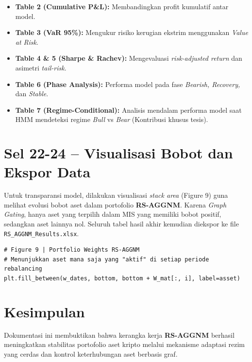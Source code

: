 \documentclass[12pt,a4paper]{article}
\begin{document}
\begin{itemize}
    \item \textbf{Table 2 (Cumulative P\&L):} Membandingkan profit kumulatif antar model.
    \item \textbf{Table 3 (VaR 95\%):} Mengukur risiko kerugian ekstrim menggunakan \textit{Value at Risk}.
    \item \textbf{Table 4 \& 5 (Sharpe \& Rachev):} Mengevaluasi \textit{risk-adjusted return} dan asimetri \textit{tail-risk}.
    \item \textbf{Table 6 (Phase Analysis):} Performa model pada fase \textit{Bearish, Recovery,} dan \textit{Stable}.
    \item \textbf{Table 7 (Regime-Conditional):} Analisis mendalam performa model saat HMM mendeteksi regime \textit{Bull} vs \textit{Bear} (Kontribusi khusus tesis).
\end{itemize}

\section{Sel 22-24 -- Visualisasi Bobot dan Ekspor Data}
Untuk transparansi model, dilakukan visualisasi \textit{stack area} (Figure 9) guna melihat evolusi bobot aset dalam portofolio \textbf{RS-AGGNM}. Karena \textit{Graph Gating}, hanya aset yang terpilih dalam MIS yang memiliki bobot positif, sedangkan aset lainnya nol. Seluruh tabel hasil akhir kemudian diekspor ke file \texttt{RS\_AGGNM\_Results.xlsx}.

\begin{lstlisting}[caption={Visualisasi evolusi bobot portofolio}]
# Figure 9 | Portfolio Weights RS-AGGNM
# Menunjukkan aset mana saja yang "aktif" di setiap periode rebalancing
plt.fill_between(w_dates, bottom, bottom + W_mat[:, i], label=asset)
\end{lstlisting}

\section{Kesimpulan}
Dokumentasi ini membuktikan bahwa kerangka kerja \textbf{RS-AGGNM} berhasil meningkatkan stabilitas portofolio aset kripto melalui mekanisme adaptasi rezim yang cerdas dan kontrol keterhubungan aset berbasis graf.
\end{document}
